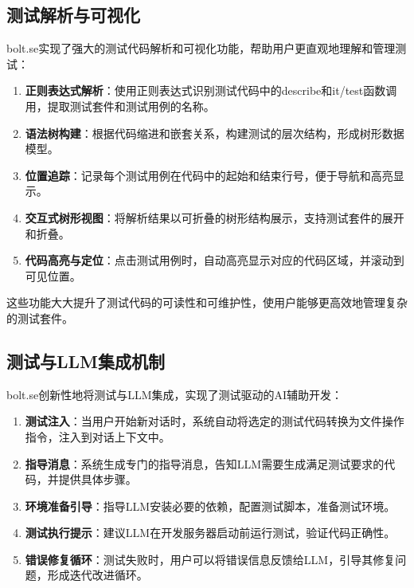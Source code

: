 \subsection{测试解析与可视化}

bolt.se实现了强大的测试代码解析和可视化功能，帮助用户更直观地理解和管理测试：

\begin{enumerate}
  \item \textbf{正则表达式解析}：使用正则表达式识别测试代码中的describe和it/test函数调用，提取测试套件和测试用例的名称。
  
  \item \textbf{语法树构建}：根据代码缩进和嵌套关系，构建测试的层次结构，形成树形数据模型。
  
  \item \textbf{位置追踪}：记录每个测试用例在代码中的起始和结束行号，便于导航和高亮显示。
  
  \item \textbf{交互式树形视图}：将解析结果以可折叠的树形结构展示，支持测试套件的展开和折叠。
  
  \item \textbf{代码高亮与定位}：点击测试用例时，自动高亮显示对应的代码区域，并滚动到可见位置。
\end{enumerate}

这些功能大大提升了测试代码的可读性和可维护性，使用户能够更高效地管理复杂的测试套件。

\subsection{测试与LLM集成机制}

bolt.se创新性地将测试与LLM集成，实现了测试驱动的AI辅助开发：

\begin{enumerate}
  \item \textbf{测试注入}：当用户开始新对话时，系统自动将选定的测试代码转换为文件操作指令，注入到对话上下文中。
  
  \item \textbf{指导消息}：系统生成专门的指导消息，告知LLM需要生成满足测试要求的代码，并提供具体步骤。
  
  \item \textbf{环境准备引导}：指导LLM安装必要的依赖，配置测试脚本，准备测试环境。
  
  \item \textbf{测试执行提示}：建议LLM在开发服务器启动前运行测试，验证代码正确性。
  
  \item \textbf{错误修复循环}：测试失败时，用户可以将错误信息反馈给LLM，引导其修复问题，形成迭代改进循环。
\end{enumerate}

